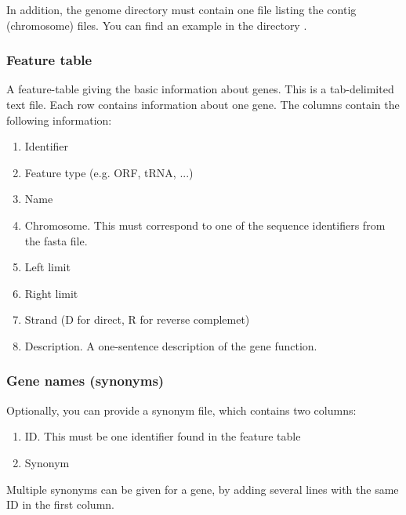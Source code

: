 In addition, the genome directory must contain one file listing the
contig (chromosome) files. You can find an example in the directory
.


\subsubsection{Feature table}

A feature-table giving the basic information about genes. This is
a tab-delimited text file. Each row contains information about one
gene. The columns contain the following information: 
\begin{enumerate}

\item Identifier

\item Feature type (e.g. ORF, tRNA, ...)

\item Name

\item Chromosome. This must correspond to one of the sequence
identifiers from the fasta file.

\item Left limit

\item Right limit

\item Strand (D for direct, R for reverse complemet)

\item Description. A one-sentence description of the gene function.

\end{enumerate}

\subsubsection{Gene names (synonyms)}

Optionally, you can provide a synonym file, which contains two
columns:

\begin{enumerate}
\item ID. This must be one identifier found in the feature table
\item Synonym
\end{enumerate}

Multiple synonyms can be given for a gene, by adding several lines with
the same ID in the first column.

